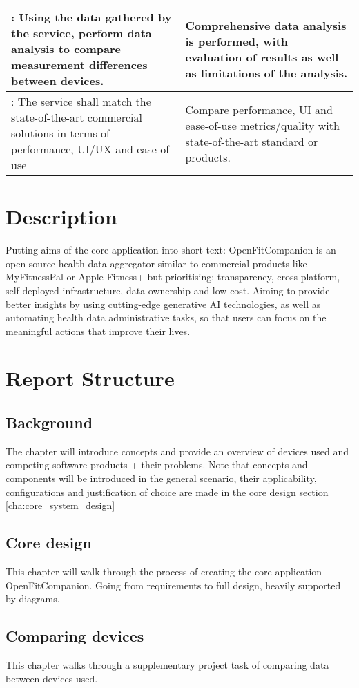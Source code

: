 \begin{center}
\begin{tabularx}{1\textwidth} {| >{\centering\arraybackslash}X 
        | >{\centering\arraybackslash}X 
        |}
    \hline
     7: Using the data gathered by the service, perform data analysis to compare measurement differences between devices. &  Comprehensive data analysis is performed, with evaluation of results as well as limitations of the analysis.\\
     \hline
     8: The service shall match the state-of-the-art commercial solutions in terms of performance, UI/UX and ease-of-use & Compare performance, UI and ease-of-use metrics/quality with state-of-the-art standard or products.  \\
     \hline
    \end{tabularx}
\end{center}
\section{Description}
Putting aims of the core application into short text: OpenFitCompanion is an open-source health data aggregator similar to commercial products like MyFitnessPal or Apple Fitness+ but prioritising: transparency, cross-platform, self-deployed infrastructure, data ownership and low cost. Aiming to provide better insights by using cutting-edge generative AI technologies, as well as automating health data administrative tasks, so that users can focus on the meaningful actions that improve their lives.
\section{Report Structure}
\subsection{Background}
The chapter will introduce concepts and provide an overview of devices used and competing software products + their problems. Note that concepts and components will be introduced in the general scenario, their applicability, configurations and justification of choice are made in the core design section \ref{cha:core_system_design}
\subsection{Core design}
This chapter will walk through the process of creating the core application - OpenFitCompanion. Going from requirements to full design, heavily supported by diagrams.
\subsection{Comparing devices}
This chapter walks through a supplementary project task of comparing data between devices used.
